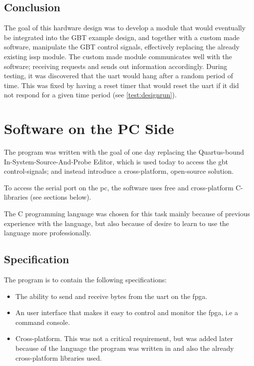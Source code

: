 \documentclass[main.tex]{subfiles}
\begin{document}
\subsection{Conclusion}

The goal of this hardware design was to develop a module that would eventually be integrated into the GBT example design, and together with a custom made software, manipulate the GBT control signals, effectively replacing the already existing \gls{issp} module. The custom made module communicates well with the software; receiving requests and sends out information accordingly. During testing, it was discovered that the \gls{uart} would hang after a random period of time. This was fixed by having a reset timer that would reset the \gls{uart} if it did not respond for a given time period (see \ref{test:designrun}).


\section{Software on the PC Side} \label{chap:software}

The program was written with the goal of one day replacing the Quartus-bound In-System-Source-And-Probe Editor, which is used today to access the \gls{gbt} control-signals; and instead introduce a cross-platform, open-source solution.

To access the serial port on the \acrshort{pc}, the software uses free and cross-platform C-libraries (see sections below).

The C programming language was chosen for this task mainly because of previous experience with the language, but also because of desire to learn to use the language more professionally. 

\subsection{Specification}

The program is to contain the following specifications:\\
\begin{itemize} \setlength{\itemsep}{10pt}
\item The ability to send and receive bytes from the \gls{uart} on the \gls{fpga}. 
\item An user interface that makes it easy to control and monitor the \gls{fpga}, i.e a command console.
\item Cross-platform. This was not a critical requirement, but was added later because of the language the program was written in and also the already cross-platform libraries used. 
\end{itemize}
\end{document}
